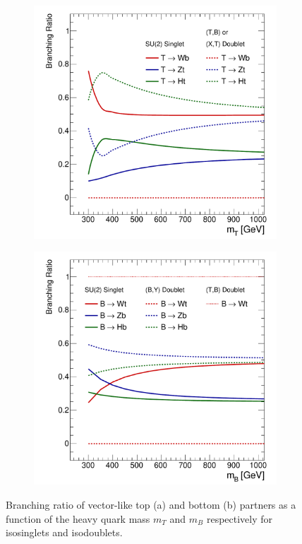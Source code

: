  \begin{figure}
   \centering
   \begin{subfigure}{0.49\textwidth}
     \includegraphics[width=\textwidth]{Theory/Figures/fig_02a.pdf}
     \label{fig:vltbrs}
     \caption{}
 \end{subfigure}
   \begin{subfigure}{0.49\textwidth}
     \includegraphics[width=\textwidth]{Theory/Figures/fig_02b.pdf}
     \label{fig:vlbbrs}
     \caption{}
 \end{subfigure}
     \caption{Branching ratio of vector-like top (a) and bottom (b) partners as a function of the heavy quark mass $m_T$ and $m_B$ respectively for isosinglets and isodoublets.}
   \label{fig:VLQ_BR}
 \end{figure}

